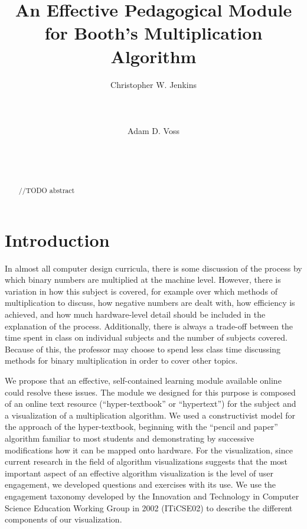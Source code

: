 \documentclass{acm_proc_article-sp}
\begin{document}
\title{An Effective Pedagogical Module for Booth's Multiplication Algorithm}

\author{
    \alignauthor
    Christopher W.
Jenkins\\
       \\
       \\
       \\
    \alignauthor
    Adam D.
Voss\\
       \\
       \\
       \\
}

\maketitle

\begin{abstract}
//TODO abstract
\end{abstract}

\section{Introduction}
In almost all computer design curricula, there is some discussion of the process by which binary numbers are multiplied at the machine level.
However, there is variation in how this subject is covered, for example over which methods of multiplication to discuss, how negative numbers are dealt with, how efficiency is achieved, and how much hardware-level detail should be included in the explanation of the process.
Additionally, there is always a trade-off between the time spent in class on individual subjects and the number of subjects covered.
Because of this, the professor may choose to spend less class time discussing methods for binary multiplication in order to cover other topics.

We propose that an effective, self-contained learning module available online could resolve these issues.
The module we designed for this purpose is composed of an online text resource (``hyper-textbook'' or ``hypertext'') for the subject and a visualization of a multiplication algorithm.
We used a constructivist model for the approach of the hyper-textbook, beginning with the ``pencil and paper'' algorithm familiar to most students and demonstrating by successive modifications how it can be mapped onto hardware.
For the visualization, since current research in the field of algorithm visualizations suggests that the most important aspect of an effective algorithm visualization is the level of user engagement\cite{tnaps:visengage}, we developed questions and exercises with its use.
We use the engagement taxonomy developed by the Innovation and Technology in Computer Science Education Working Group in 2002 (ITiCSE02) to describe the different components of our visualization.
\end{document}
